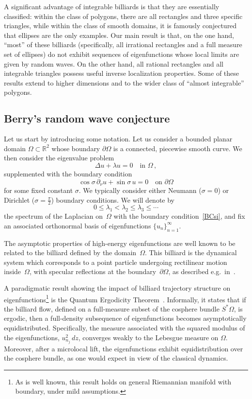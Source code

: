 \documentclass{amsart}
\theoremstyle{definition}
\theoremstyle{remark}
\newcommand{\la}{\lambda}
\newcommand{\si}{\sigma}
\newcommand{\De}{\Delta}
\newcommand{\Om}{\Omega}
\def\RR{\mathbb{R}}
\newcommand{\pd}{\partial}
\renewcommand\leq\leqslant
\numberwithin{equation}{section}
\theoremstyle{definition}
\theoremstyle{remark}
\def\RR{\mathbb{R}}
\begin{document}
A significant advantage of integrable billiards is that they are essentially classified: within the class of polygons, there are all rectangles and three specific triangles, while within the class of smooth domains, it is famously conjectured that ellipses are the only examples. Our main result is that, on the one hand, ``most'' of these billiards (specifically, all irrational rectangles and a full measure set of ellipses) do not exhibit sequences of eigenfunctions whose local limits are given by random waves. On the other hand, all rational rectangles and all integrable triangles possess useful inverse localization properties. Some of these results extend to higher dimensions and to the wider class of ``almost integrable'' polygons.


\subsection{Berry's random wave conjecture}

Let us start by introducing some notation. Let us consider a bounded planar domain $\Om\subset\RR^2$ whose boundary $\partial\Om$ is a connected, piecewise smooth curve. We then consider the eigenvalue problem
\begin{equation}
	\De u + \la u=0\quad \text{in }\Om\,,
\end{equation}	
supplemented with the boundary condition
\begin{equation}\label{BCsi}
	\cos\si \, \pd_\nu u +\sin \si \, u =0 \quad \text{on }\pd\Om
\end{equation}
for some fixed constant $\si$. We typically consider either Neumann ($\si=0$) or Dirichlet ($\si=\frac\pi2$) boundary conditions. We will denote by
\begin{equation}
	0\leq \la_1<\la_2\leq \la_3\leq \cdots
\end{equation}
the spectrum of the Laplacian on~$\Omega$ with the boundary condition~\eqref{BCsi}, and fix an associated orthonormal basis of eigenfunctions $\{ u_n\}_{n=1}^\infty$. 

The asymptotic properties of high-energy eigenfunctions are well known to be related to the billiard defined by the domain~$\Om$. This billiard is the dynamical system which corresponds to a point particle undergoing rectilinear motion inside~$\Omega$, with specular reflections at the boundary~$\pd\Omega$, as described e.g.\ in~\cite{ChernovMarkarian2006}.


A paradigmatic result showing the impact of billiard trajectory structure on eigenfunctions\footnote{As is well known, this result holds on general Riemannian manifold with boundary, under mild assumptions.} is the Quantum Ergodicity Theorem~\cite{sh,ze-QUE,CdV,GL,ZZ}. Informally, it states that if the billiard flow, defined on a full-measure subset of the cosphere bundle \( S^*\Om \), is ergodic, then a full-density subsequence of eigenfunctions  becomes asymptotically equidistributed. Specifically, the  measure associated with the squared modulus of the eigenfunctions, $u_{n_j}^2\, dz$, converges weakly to the Lebesgue measure on \(\Om\). Moreover, after a microlocal lift, the eigenfunctions exhibit equidistribution over the cosphere bundle, as one would expect in view of the classical dynamics.
\end{document}
